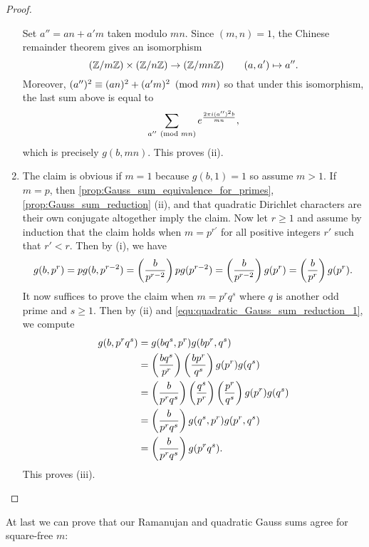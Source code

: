 \begin{proof}
\begin{enumerate}[label=(\roman*)]
\[            \]
            Set $a'' = an+a'm$ taken modulo $mn$. Since $(m,n) = 1$, the Chinese remainder theorem gives an isomorphism
            \[
              (\mathbb{Z}/m\mathbb{Z}) \times (\mathbb{Z}/n\mathbb{Z}) \to (\mathbb{Z}/mn\mathbb{Z}) \qquad (a,a') \mapsto a''.
            \]
            Moreover, $(a'')^{2} \equiv (an)^{2}+(a'm)^{2} \ \left(\text{mod }mn\right)$ so that under this isomorphism, the last sum above is equal to
            \[
              \sum_{a'' \ \left(\text{mod }mn\right)}e^{\frac{2\pi i(a'')^{2}b}{mn}},
            \]
            which is precisely $g(b,mn)$. This proves (ii).
          \item The claim is obvious if $m = 1$ because $g(b,1) = 1$ so assume $m > 1$. If $m = p$, then \cref{prop:Gauss_sum_equivalence_for_primes}, \cref{prop:Gauss_sum_reduction} (ii), and that quadratic Dirichlet characters are their own conjugate altogether imply the claim. Now let $r \ge 1$ and assume by induction that the claim holds when $m = p^{r'}$ for all positive integers $r'$ such that $r' < r$. Then by (i), we have
          \begin{equation}\label{equ:quadratic_Gauss_sum_reduction_1}
            g(b,p^{r}) = pg(b,p^{r-2}) = \left(\frac{b}{p^{r-2}}\right)pg(p^{r-2}) = \left(\frac{b}{p^{r-2}}\right)g(p^{r}) = \left(\frac{b}{p^{r}}\right)g(p^{r}).
          \end{equation}
          It now suffices to prove the claim when $m = p^{r}q^{s}$ where $q$ is another odd prime and $s \ge 1$. Then by (ii) and \cref{equ:quadratic_Gauss_sum_reduction_1}, we compute
          \begin{align*}
            g(b,p^{r}q^{s}) &= g(bq^{s},p^{r})g(bp^{r},q^{s}) \\
            &= \left(\frac{bq^{s}}{p^{r}}\right)\left(\frac{bp^{r}}{q^{s}}\right)g(p^{r})g(q^{s}) \\
            &= \left(\frac{b}{p^{r}q^{s}}\right)\left(\frac{q^{s}}{p^{r}}\right)\left(\frac{p^{r}}{q^{s}}\right)g(p^{r})g(q^{s}) \\
            &= \left(\frac{b}{p^{r}q^{s}}\right)g(q^{s},p^{r})g(p^{r},q^{s}) \\
            &= \left(\frac{b}{p^{r}q^{s}}\right)g(p^{r}q^{s}).
          \end{align*}
          This proves (iii).
        \end{enumerate}
      \end{proof}

      At last we can prove that our Ramanujan and quadratic Gauss sums agree for square-free $m$:

